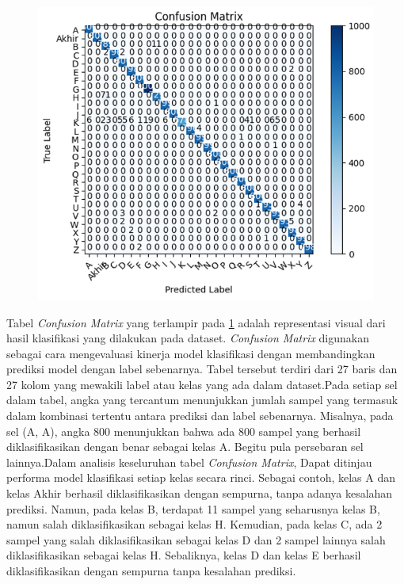 \begin{figure}[!hbt]
	\centering
	\includegraphics[width=0.7\linewidth]{gambar/bener/ConfusionMatrix_ModelCNN.png}
	\label{fig:TabelModelCNN1}
\end{figure}


Tabel \textit{Confusion Matrix} yang terlampir pada \ref{fig:TabelModelCNN1} adalah representasi visual dari hasil klasifikasi yang dilakukan pada dataset. \textit{Confusion Matrix} digunakan sebagai cara mengevaluasi kinerja model klasifikasi dengan membandingkan prediksi model dengan label sebenarnya. Tabel tersebut terdiri dari 27 baris dan 27 kolom yang mewakili label atau kelas yang ada dalam dataset.Pada setiap sel dalam tabel, angka yang tercantum menunjukkan jumlah sampel yang termasuk dalam kombinasi tertentu antara prediksi dan label sebenarnya. Misalnya, pada sel (A, A), angka 800 menunjukkan bahwa ada 800 sampel yang berhasil diklasifikasikan dengan benar sebagai kelas A. Begitu pula persebaran sel lainnya.Dalam analisis keseluruhan tabel \textit{Confusion Matrix}, Dapat ditinjau performa model klasifikasi setiap kelas secara rinci. Sebagai contoh, kelas A dan kelas Akhir berhasil diklasifikasikan dengan sempurna, tanpa adanya kesalahan prediksi. Namun, pada kelas B, terdapat 11 sampel yang seharusnya kelas B, namun salah diklasifikasikan sebagai kelas H. Kemudian, pada kelas C, ada 2 sampel yang salah diklasifikasikan sebagai kelas D dan 2 sampel lainnya salah diklasifikasikan sebagai kelas H. Sebaliknya, kelas D dan kelas E berhasil diklasifikasikan dengan sempurna tanpa kesalahan prediksi.

